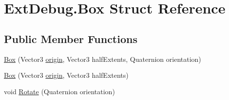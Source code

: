 \hypertarget{struct_ext_debug_1_1_box}{}\section{Ext\+Debug.\+Box Struct Reference}
\label{struct_ext_debug_1_1_box}
\subsection*{Public Member Functions}
\begin{DoxyCompactItemize}
\item 
\mbox{\hyperlink{struct_ext_debug_1_1_box_a2eab3f266341758846183edf62bbe91d}{Box}} (Vector3 \mbox{\hyperlink{struct_ext_debug_1_1_box_a51a1f8d9daa4658d72f41d37adf23e82}{origin}}, Vector3 half\+Extents, Quaternion orientation)
\item 
\mbox{\hyperlink{struct_ext_debug_1_1_box_aa801e1ffbe8f7f516126bc49a5dcd5e5}{Box}} (Vector3 \mbox{\hyperlink{struct_ext_debug_1_1_box_a51a1f8d9daa4658d72f41d37adf23e82}{origin}}, Vector3 half\+Extents)
\item 
void \mbox{\hyperlink{struct_ext_debug_1_1_box_ae76be224e6a60930f3ede6b37502e537}{Rotate}} (Quaternion orientation)
\end{DoxyCompactItemize}
